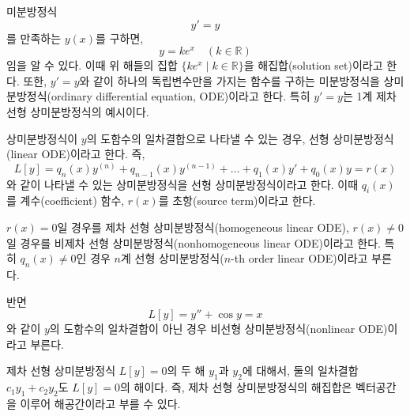 \documentclass[../engineering_mathematics_lecture_note.tex]{subfiles}
\begin{document}
미분방정식
\begin{equation*}
    y' = y
\end{equation*}
를 만족하는 $y(x)$를 구하면,
\begin{equation*}
    y = ke^x \quad (k \in \mathbb R)
\end{equation*}
임을 알 수 있다.
이때 위 해들의 집합 $\{ke^x \mid k \in \mathbb R\}$을 해집합(solution set)이라고 한다.
또한, $y' = y$와 같이 하나의 독립변수만을 가지는 함수를 구하는 미분방정식을 상미분방정식(ordinary differential equation, ODE)이라고 한다.
특히 $y' = y$는 1계 제차 선형 상미분방정식의 예시이다.

\begin{definition}
    상미분방정식이 $y$의 도함수의 일차결합으로 나타낼 수 있는 경우, 선형 상미분방정식(linear ODE)이라고 한다.
    즉,
    \begin{equation*}
        L[y] = q_n(x) y^{(n)} + q_{n - 1}(x) y^{(n - 1)} + \dots + q_1(x) y' + q_0(x) y = r(x)
    \end{equation*}
    와 같이 나타낼 수 있는 상미분방정식을 선형 상미분방정식이라고 한다.
    이때 $q_i(x)$를 계수(coefficient) 함수, $r(x)$를 초항(source term)이라고 한다.

    $r(x) = 0$일 경우를 제차 선형 상미분방정식(homogeneous linear ODE), $r(x) \neq 0$일 경우를 비제차 선형 상미분방정식(nonhomogeneous linear ODE)이라고 한다.
    특히 $q_n(x) \neq 0$인 경우 $n$계 선형 상미분방정식($n$-th order linear ODE)이라고 부른다.

    반면
    \begin{equation*}
        L[y] = y'' + \cos y = x
    \end{equation*}
    와 같이 $y$의 도함수의 일차결합이 아닌 경우 비선형 상미분방정식(nonlinear ODE)이라고 부른다.
\end{definition}

\begin{theorem}
    제차 선형 상미분방정식 $L[y] = 0$의 두 해 $y_1$과 $y_2$에 대해서, 둘의 일차결합 $c_1 y_1 + c_2 y_2$도 $L[y] = 0$의 해이다.
    즉, 제차 선형 상미분방정식의 해집합은 벡터공간을 이루어 해공간이라고 부를 수 있다.
\end{theorem}
\end{document}
